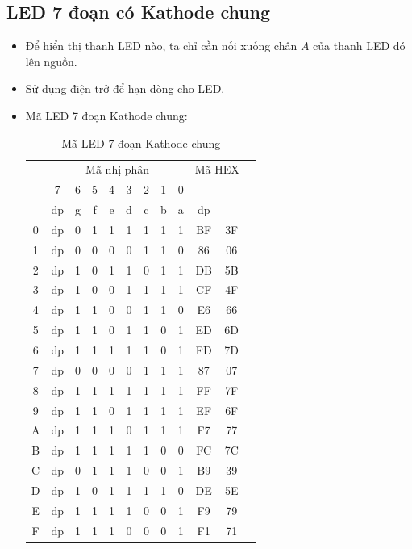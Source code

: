 \tocless \subsection{LED 7 đoạn có Kathode chung}
\begin{itemize}
\item Để hiển thị thanh LED nào, ta chỉ cần nối xuống chân $A$ của thanh LED đó lên nguồn.
\item Sử dụng điện trở để hạn dòng cho LED.
\item Mã LED 7 đoạn Kathode chung:
\begin{table}[!h]
\begin{center}
\begin{longtable}{|c|c|c|c|c|c|c|c|c|c|c|c|}\hline
\multirow{3}{.5cm}{\centering{Số}} & \multicolumn{8}{|c|}{Mã nhị phân} & \multicolumn{2}{|c|}{Mã HEX}\\ \cline{2-9}
& 7 & 6 & 5 & 4 & 3 & 2 & 1 & 0 & \multicolumn{2}{c|}{}\\ \cline{2-11}
& dp & g & f & e & d & c & b & a & dp & \\ \hline
0 & dp & 0 & 1 & 1 & 1 & 1 & 1 & 1 &  BF & 3F\\ \hline
1 & dp & 0 & 0 & 0 & 0 & 1 & 1 & 0 &  86 & 06\\ \hline
2 & dp & 1 & 0 & 1 & 1 & 0 & 1 & 1 &  DB & 5B\\ \hline
3 & dp & 1 & 0 & 0 & 1 & 1 & 1 & 1 &  CF & 4F\\ \hline
4 & dp & 1 & 1 & 0 & 0 & 1 & 1 & 0 &  E6 & 66\\ \hline
5 & dp & 1 & 1 & 0 & 1 & 1 & 0 & 1 &  ED & 6D\\ \hline
6 & dp & 1 & 1 & 1 & 1 & 1 & 0 & 1 &  FD & 7D\\ \hline
7 & dp & 0 & 0 & 0 & 0 & 1 & 1 & 1 &  87 & 07\\ \hline
8 & dp & 1 & 1 & 1 & 1 & 1 & 1 & 1 &  FF & 7F\\ \hline
9 & dp & 1 & 1 & 0 & 1 & 1 & 1 & 1 &  EF & 6F\\ \hline
A & dp & 1 & 1 & 1 & 0 & 1 & 1 & 1 &  F7 & 77\\ \hline
B & dp & 1 & 1 & 1 & 1 & 1 & 0 & 0 &  FC & 7C\\ \hline
C & dp & 0 & 1 & 1 & 1 & 0 & 0 & 1 &  B9 & 39\\ \hline
D & dp & 1 & 0 & 1 & 1 & 1 & 1 & 0 &  DE & 5E\\ \hline
E & dp & 1 & 1 & 1 & 1 & 0 & 0 & 1 &  F9 & 79\\ \hline
F & dp & 1 & 1 & 1 & 0 & 0 & 0 & 1 &  F1 & 71\\ \hline
\end{longtable}
\end{center}
\caption{Mã LED 7 đoạn Kathode chung}\label{Fig:led-7-seg-kathode}
\end{table}
\end{itemize}
